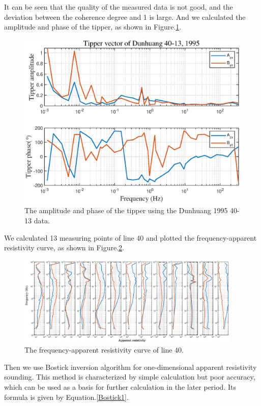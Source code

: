 \documentclass[9pt,a4paper,twoside]{rho-class/rho}
\begin{document}
It can be seen that the quality of the measured data is not good, and the deviation between the coherence degree and 1 is large. And we calculated the amplitude and phase of the tipper, as shown in Figure.\ref{fig:tp40-13}.

\begin{figure}[htbp]
    \centering
    \includegraphics[width=0.95\columnwidth]{figures/tp40-13.eps}
    \caption{The amplitude and phase of the tipper using the Dunhuang 1995 40-13 data.}
    \label{fig:tp40-13}
\end{figure}

We calculated 13 measuring points of line 40 and plotted the frequency-apparent resistivity curve, as shown in Figure.\ref{fig:Line40}.

\begin{figure}[htpb]
    \centering
    \includegraphics[width=0.95\textwidth]{figures/Line40.eps}
    \caption{The frequency-apparent resistivity curve of line 40.}
    \label{fig:Line40}
\end{figure}

Then we use Bostick inversion algorithm for one-dimensional apparent resistivity sounding. This method is characterized by simple calculation but poor accuracy, which can be used as a basis for further calculation in the later period. Its formula is given by Equation.\eqref{Bostick1}.
\end{document}
